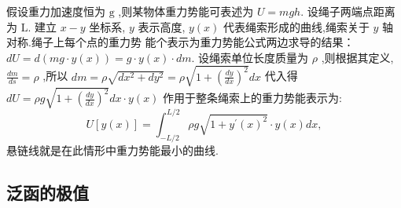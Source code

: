\begin{itemize}
  假设重力加速度恒为 $\mathrm{g}$ ,则某物体重力势能可表述为 $U=m g h$. 设绳子两端点距离为 $\mathrm{L}$.
建立 $x-y$ 坐标系, $y$ 表示高度, $y(x)$ 代表绳索形成的曲线,绳索关于 $y$ 轴对称.绳子上每个点的重力势 能个表示为重力势能公式两边求导的结果： $d U=d(m g \cdot y(x))=g \cdot y(x) \cdot d m$.
设绳索单位长度质量为 $\rho$ ,则根据其定义, $\frac{d m}{d s}=\rho$ ,所以
$d m=\rho \sqrt{d x^2+d y^2}=\rho \sqrt{1+\left(\frac{d y}{d x}\right)^2} d x$
代入得 $d U=\rho g \sqrt{1+\left(\frac{d y}{d x}\right)^2} d x \cdot y(x)$
作用于整条绳索上的重力势能表示为:
$$
U[y(x)]=\int_{-L / 2}^{L / 2} \rho g \sqrt{1+y^{\prime}(x)^2} \cdot y(x) d x,
$$
悬链线就是在此情形中重力势能最小的曲线. 


\end{itemize}



\subsection{泛函的极值}

